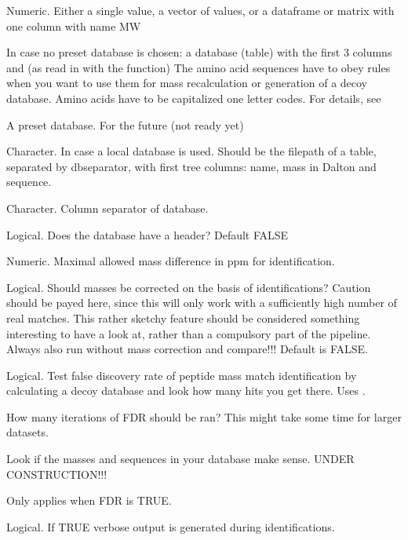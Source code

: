 \documentclass[letterpaper]{book}
\begin{document}
\begin{Arguments}
\begin{ldescription}
\item[\code{input}] Numeric. Either a single value, a vector of values, or a dataframe or matrix with one column with name MW

\item[\code{db}] In case no preset database is chosen: a database (table) with the first 3 columns  and  (as read in with the  function) The amino acid sequences have to obey rules when you want to use them for mass recalculation or generation of a decoy database. Amino acids have to be capitalized one letter codes. For details, see 

\item[\code{presetdb}] A preset database. For the future (not ready yet)

\item[\code{dbpath}] Character. In case a local database is used. Should be the filepath of a table, separated by dbseparator, with first tree columns: name, mass in Dalton and sequence.

\item[\code{dbseparator}] Character. Column separator of database.

\item[\code{dbheader}] Logical. Does the database have a header? Default FALSE

\item[\code{ID\_thresh}] Numeric. Maximal allowed mass difference in ppm for identification.

\item[\code{masscorrection}] Logical. Should masses be corrected on the basis of identifications? Caution should be payed here, since this will only work with a sufficiently high number of real matches. This rather sketchy feature should be considered something interesting to have a look at, rather than a compulsory part of the pipeline. Always also run without mass correction and compare!!! Default is FALSE.

\item[\code{FDR}] Logical. Test false discovery rate of peptide mass match identification by calculating a decoy database and look how many hits you get there. Uses .

\item[\code{iterations}] How many iterations of FDR should be ran? This might take some time for larger datasets.

\item[\code{checkdb}] Look if the masses and sequences in your database make sense. UNDER CONSTRUCTION!!!

\item[\code{graphics}] Only applies when FDR is TRUE.

\item[\code{verbose}] Logical. If TRUE verbose output is generated during identifications.
\end{ldescription}
\end{Arguments}
\end{document}
